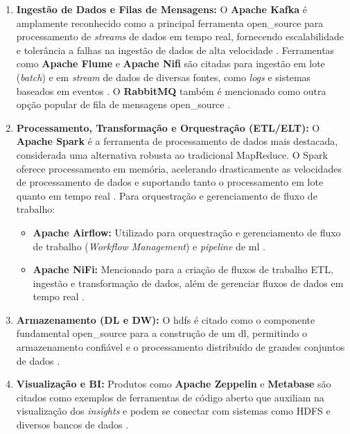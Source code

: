 \begin{enumerate}
    \item \textbf{Ingestão de Dados e Filas de Mensagens:}
    O \textbf{Apache Kafka} é amplamente reconhecido como a principal ferramenta \acs{open_source} para processamento de \textit{streams} de dados em tempo real, fornecendo escalabilidade e tolerância a falhas na ingestão de dados de alta velocidade \cite[]{murarka2024, mbata2024survey}. Ferramentas como \textbf{Apache Flume} e \textbf{Apache Nifi} são citadas para ingestão em lote (\textit{batch}) e em \textit{stream} de dados de diversas fontes, como \textit{logs} e sistemas baseados em eventos \cite[]{murarka2024}. O \textbf{RabbitMQ} também é mencionado como outra opção popular de fila de mensagens \acs{open_source} \cite[]{septian2019}.

    \item \textbf{Processamento, Transformação e Orquestração (ETL/ELT):}
    O \textbf{Apache Spark} é a ferramenta de processamento de dados mais destacada, considerada uma alternativa robusta ao tradicional MapReduce. O Spark oferece processamento em memória, acelerando drasticamente as velocidades de processamento de dados e suportando tanto o processamento em lote quanto em tempo real \cite[]{murarka2024, septian2019, mbata2024survey}. Para orquestração e gerenciamento de fluxo de trabalho:
    \begin{itemize}
        \item \textbf{Apache Airflow:} Utilizado para orquestração e gerenciamento de fluxo de trabalho (\textit{Workflow Management}) e \textit{pipeline} de \acs{ml} \cite[]{mbata2024survey}.
        \item \textbf{Apache NiFi:} Mencionado para a criação de fluxos de trabalho ETL, ingestão e transformação de dados, além de gerenciar fluxos de dados em tempo real \cite[]{mbata2024survey}.
    \end{itemize}

    \item \textbf{Armazenamento (DL e DW):}
    O \acs{hdfs} é citado como o componente fundamental \acs{open_source} para a construção de um \acs{dl}, permitindo o armazenamento confiável e o processamento distribuído de grandes conjuntos de dados \cite[]{murarka2024, septian2019}.

    \item \textbf{Visualização e BI:}
    Produtos como \textbf{Apache Zeppelin} e \textbf{Metabase} são citados como exemplos de ferramentas de código aberto que auxiliam na visualização dos \textit{insights} e podem se conectar com sistemas como HDFS e diversos bancos de dados \cite[]{septian2019}.
\end{enumerate}

